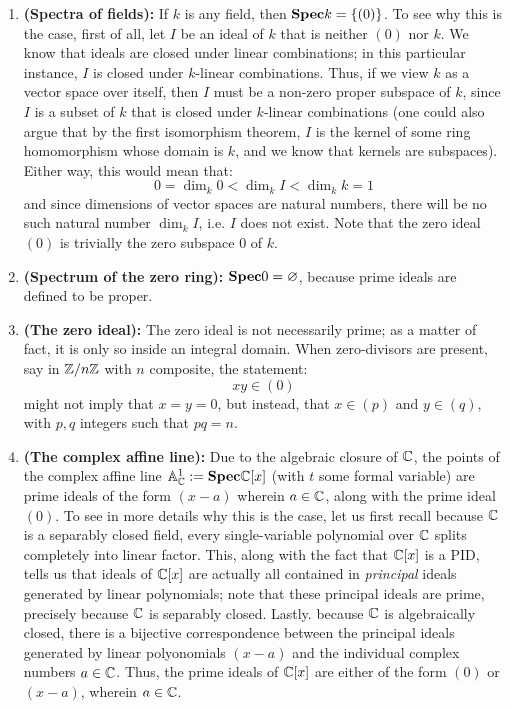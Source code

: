                 \begin{example} \label{example: spectra_sets}
                    \noindent
                    \begin{enumerate}
                        \item \textbf{(Spectra of fields):} If $k$ is any field, then $\mathbf{Spec} k = \{(0)\}$. To see why this is the case, first of all, let $I$ be an ideal of $k$ that is neither $(0)$ nor $k$. We know that ideals are closed under linear combinations; in this particular instance, $I$ is closed under $k$-linear combinations. Thus, if we view $k$ as a vector space over itself, then $I$ must be a non-zero proper subspace of $k$, since $I$ is a subset of $k$ that is closed under $k$-linear combinations (one could also argue that by the first isomorphism theorem, $I$ is the kernel of some ring homomorphism whose domain is $k$, and we know that kernels are subspaces). Either way, this would mean that:
        					$$0 = \dim_k 0 < \dim_k I < \dim_k k = 1$$
        				and since dimensions of vector spaces are natural numbers, there will be no such natural number $\dim_k I$, i.e. $I$ does not exist. Note that the zero ideal $(0)$ is trivially the zero subspace $0$ of $k$.
        				\item \textbf{(Spectrum of the zero ring):} $\mathbf{Spec} 0 = \varnothing$, because prime ideals are defined to be proper.
        				\item \textbf{(The zero ideal):} The zero ideal is not necessarily prime; as a matter of fact, it is only so inside an integral domain. When zero-divisors are present, say in $\mathbb{Z}/n\mathbb{Z}$ with $n$ composite, the statement:
        				    $$xy \in (0)$$
    				    might not imply that $x = y = 0$, but instead, that $x \in (p)$ and $y \in (q)$, with $p, q$ integers such that $pq = n$.
        				\item \textbf{(The complex affine line):} Due to the algebraic closure of $\mathbb{C}$, the points of the complex affine line $\mathbb{A}^1_{\mathbb{C}} := \mathbf{Spec} \mathbb{C}[x]$ (with $t$ some formal variable) are prime ideals of the form $(x - a)$ wherein $a \in \mathbb{C}$, along with the prime ideal $(0)$. To see in more details why this is the case, let us first recall because $\mathbb{C}$ is a separably closed field, every single-variable polynomial over $\mathbb{C}$ splits completely into linear factor. This, along with the fact that $\mathbb{C}[x]$ is a PID, tells us that ideals of $\mathbb{C}[x]$ are actually all contained in \textit{principal} ideals generated by linear polynomials; note that these principal ideals are prime, precisely because $\mathbb{C}$ is separably closed. Lastly. because $\mathbb{C}$ is algebraically closed, there is a bijective correspondence between the principal ideals generated by linear polyonomials $(x - a)$ and the individual complex numbers $a \in \mathbb{C}$. Thus, the prime ideals of $\mathbb{C}[x]$ are either of the form $(0)$ or $(x - a)$, wherein $a \in \mathbb{C}$. 

\end{enumerate}
\end{example}
